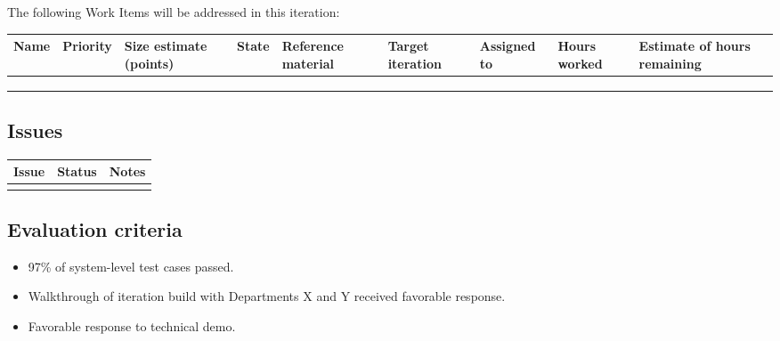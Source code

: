 The following Work Items will be addressed in this iteration:

\begin{adjustbox}{width=\textwidth}
\noindent\begin{tabular}{|l|l|l|l|l|l|l|l|l|}
\hline
Name & Priority & Size estimate (points) & State & Reference material & Target iteration & Assigned to & Hours worked & Estimate of hours remaining \\ \hline
     &          &                        &       &                    &                  &             &              &                             \\ \hline
     &          &                        &       &                    &                  &             &              &                             \\ \hline
     &          &                        &       &                    &                  &             &              &                             \\ \hline
\end{tabular}
\end{adjustbox}

\subsection*{Issues}


\noindent\begin{tabular}{|l|l|l|}
\hline
Issue & Status & Notes \\
\hline
 &  & \\
\hline
\end{tabular}

\subsection*{Evaluation criteria}


\begin{itemize}
	\item 97\% of system-level test cases passed.
	\item	Walkthrough of iteration build with Departments X and Y received favorable response.
	\item Favorable response to technical demo.
\end{itemize}

